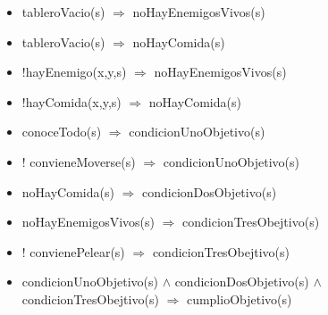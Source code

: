\begin{itemize}
\item tableroVacio(s) $\Rightarrow$ noHayEnemigosVivos(s) 
\item tableroVacio(s) $\Rightarrow$ noHayComida(s)

\item !hayEnemigo(x,y,s) $\Rightarrow$ noHayEnemigosVivos(s) 
\item !hayComida(x,y,s) $\Rightarrow$ noHayComida(s)

\item conoceTodo(s) $\Rightarrow$ condicionUnoObjetivo(s)
\item ! convieneMoverse(s) $\Rightarrow$ condicionUnoObjetivo(s)
\item noHayComida(s) $\Rightarrow$ condicionDosObjetivo(s)
\item noHayEnemigosVivos(s) $\Rightarrow$ condicionTresObejtivo(s)
\item ! convienePelear(s) $\Rightarrow$ condicionTresObejtivo(s)

\item  condicionUnoObjetivo(s) $\land$ condicionDosObjetivo(s)
$\land$ condicionTresObejtivo(s) $\Rightarrow$ cumplioObjetivo(s)

\end{itemize}


